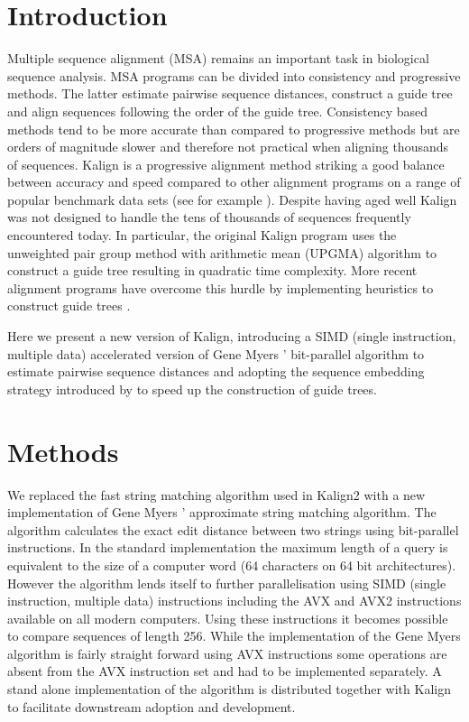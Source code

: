 \documentclass[nocrop]{bioinfo}
\begin{document}
\section{Introduction}
  Multiple sequence alignment (MSA) remains an important task in biological sequence analysis. MSA programs can be divided into consistency and progressive methods. The latter estimate pairwise sequence distances, construct a guide tree and align sequences following the order of the guide tree. Consistency based methods tend to be more accurate than compared to progressive methods but are orders of magnitude slower and therefore not practical when aligning thousands of sequences.
Kalign \citep{lassmann2008kalign2} is {\color{red} a} progressive alignment method striking a good balance between accuracy and speed compared to other alignment programs on a range of popular benchmark data sets (see for example \cite{sievers2011fast}). Despite having aged well Kalign was not designed to handle the tens of thousands of sequences frequently encountered today. In particular, the original Kalign program uses the unweighted pair group method with arithmetic mean (UPGMA) algorithm to construct a guide tree resulting in quadratic time complexity. More recent alignment programs have overcome this hurdle by implementing heuristics to construct guide trees \citep{katoh2006parttree,blackshields2010sequence}. 

Here we present a new version of Kalign, introducing a SIMD (single instruction, multiple data) accelerated version of Gene Myers{\color{red} '} bit-parallel algorithm \citep{myers1999fast} to estimate pairwise sequence distances and adopting the sequence embedding strategy introduced by \cite{blackshields2010sequence} to speed up the construction of guide trees. 
\section{Methods}
We replaced the fast string matching algorithm used in Kalign2 \citep{muth1996approximate} with a new implementation of Gene Myers{\color{red} '} approximate string matching algorithm. The algorithm calculates the exact edit distance between two strings using bit-parallel instructions. In the standard implementation the maximum length of a query is equivalent to the size of a computer word (64 characters on 64 bit architectures). However the algorithm lends itself to further parallelisation using SIMD (single instruction, multiple data) instructions including the AVX and AVX2 instructions available on all modern computers. Using these instructions it becomes possible to compare sequences of length 256. While the implementation of the Gene Myers algorithm is fairly straight forward using AVX instructions some operations are absent from the AVX instruction set and had to be implemented separately. A stand alone implementation of the algorithm is distributed together with Kalign to facilitate downstream adoption and development.
\end{document}

